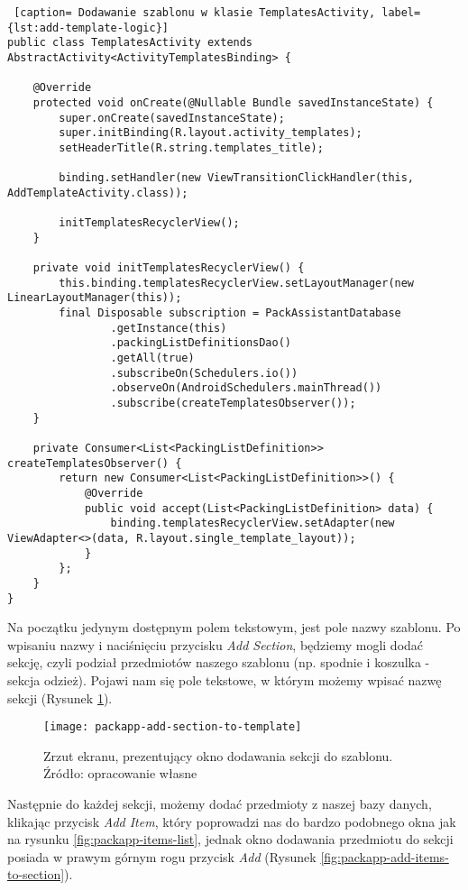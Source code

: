 \documentclass[a4paper,12pt]{article}
\begin{document}
\begin{lstlisting} [caption= Dodawanie szablonu w klasie TemplatesActivity, label={lst:add-template-logic}]
public class TemplatesActivity extends AbstractActivity<ActivityTemplatesBinding> {

    @Override
    protected void onCreate(@Nullable Bundle savedInstanceState) {
        super.onCreate(savedInstanceState);
        super.initBinding(R.layout.activity_templates);
        setHeaderTitle(R.string.templates_title);

        binding.setHandler(new ViewTransitionClickHandler(this, AddTemplateActivity.class));

        initTemplatesRecyclerView();
    }

    private void initTemplatesRecyclerView() {
        this.binding.templatesRecyclerView.setLayoutManager(new LinearLayoutManager(this));
        final Disposable subscription = PackAssistantDatabase
                .getInstance(this)
                .packingListDefinitionsDao()
                .getAll(true)
                .subscribeOn(Schedulers.io())
                .observeOn(AndroidSchedulers.mainThread())
                .subscribe(createTemplatesObserver());
    }

    private Consumer<List<PackingListDefinition>> createTemplatesObserver() {
        return new Consumer<List<PackingListDefinition>>() {
            @Override
            public void accept(List<PackingListDefinition> data) {
                binding.templatesRecyclerView.setAdapter(new ViewAdapter<>(data, R.layout.single_template_layout));
            }
        };
    }
}
\end{lstlisting}

Na początku jedynym dostępnym polem tekstowym, jest pole nazwy szablonu. Po wpisaniu nazwy i naciśnięciu przycisku \textit{Add Section}, będziemy mogli dodać sekcję, czyli podział przedmiotów naszego szablonu (np. spodnie i koszulka - sekcja odzież). Pojawi nam się pole tekstowe, w którym możemy wpisać nazwę sekcji (Rysunek \ref{fig:packapp-add-section-to-template}).

\begin{figure}[H]
    \centering
    \texttt{[image: packapp-add-section-to-template]}
    \caption{Zrzut ekranu, prezentujący okno dodawania sekcji do szablonu. Źródło: opracowanie własne}
    \label{fig:packapp-add-section-to-template}
\end{figure}

Następnie do każdej sekcji, możemy dodać przedmioty z naszej bazy danych, klikając przycisk \textit{Add Item}, który poprowadzi nas do bardzo podobnego okna jak na rysunku \ref{fig:packapp-items-list}, jednak okno dodawania przedmiotu do sekcji posiada w prawym górnym rogu przycisk \textit{Add} (Rysunek \ref{fig:packapp-add-items-to-section}).
\end{document}
